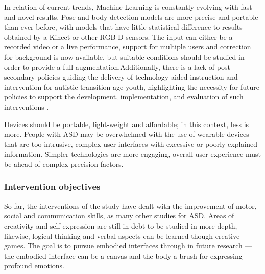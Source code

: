 \documentclass[a4paper,fleqn]{cas-sc}
\begin{document}
In relation of current trends, Machine Learning is constantly evolving with fast and novel results. Pose and body detection models are more precise and portable than ever before, with models that have little statistical difference to results obtained by a Kinect or other RGB-D sensors. The input can either be a recorded video or a live performance, support for multiple users and correction for background is now available, but suitable conditions should be studied in order to provide a full augmentation.Additionally, there is a lack of post-secondary policies guiding the delivery of technology-aided instruction and intervention for autistic transition-age youth, highlighting the necessity for future policies to support the development, implementation, and evaluation of such interventions \cite{Sherwood24}.

Devices should be portable, light-weight and affordable; in this context, less is more. People with ASD may be overwhelmed with the use of wearable devices that are too intrusive, complex user interfaces with excessive or poorly explained information. Simpler technologies are more engaging, overall user experience must be ahead of complex precision factors.

\subsubsection{Intervention objectives}

So far, the interventions of the study have dealt with the improvement of motor, social and communication skills, as many other studies for ASD. Areas of creativity and self-expression are still in debt to be studied in more depth, likewise, logical thinking and verbal aspects can be learned though creative games. The goal is to pursue embodied interfaces through in future research — the embodied interface can be a canvas and the body a brush for expressing profound emotions.
\end{document}
